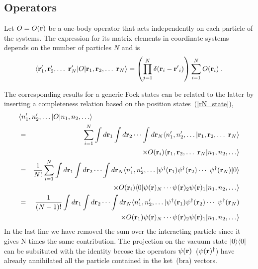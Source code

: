 \subsection{Operators}

Let ${O}=O({\bf r})$ be a one-body operator that acts independently on each particle
of the systems. The expression for its matrix elements in coordinate systems
depends on the number of particles $N$ and is
\begin{equation}
\langle {\bf r}'_1, {\bf r}'_2, \ldots \; {\bf r}'_N \vert {O}
\vert {\bf r}_1, {\bf r}_2, \ldots \; {\bf r}_N \rangle
 = \left( \prod_{j=1}^N  \delta({\bf r}_i - {\bf r'}_i) \right) \sum_{i=1}^N O({\bf r}_i)  \; .
\end{equation}

The corresponding results for a generic Fock states can be related to the latter by inserting a completeness relation based on the position states~(\ref{rN_state}),
\begin{eqnarray}
\lefteqn{
  \langle n'_1, n'_2, \ldots \vert {O} \vert n_1, n_2, \ldots  \rangle
} & &
\nonumber \\ 
 &=&  \sum_{i=1}^N \int d{\bf r}_1 \int d{\bf r}_2 \cdots \int d{\bf r}_N 
     \langle n'_1, n'_2, \ldots \vert {\bf r}_1, {\bf r}_2, \ldots \; {\bf r}_N \rangle 
\nonumber \\
 & &  \hspace{2.0cm}  \times O({\bf r}_i) 
    \langle  {\bf r}_1, {\bf r}_2, \ldots \; {\bf r}_N \vert n_1, n_2, \ldots  \rangle 
\\ 
 &=& \frac{1}{N!} \sum_{i=1}^N \int d{\bf r}_1 \int d{\bf r}_2 \cdots \int d{\bf r}_N 
    \langle n'_1, n'_2, \ldots \vert  \psi^\dag({\bf r}_1) \psi^\dag({\bf r}_2) \cdots \; \psi^\dag({\bf r}_N)
    \vert 0 \rangle
\nonumber \\
 & &  \hspace{2.0cm}  \times O({\bf r}_i)  
     \langle 0 \vert \psi({\bf r})_N \cdots \psi({\bf r})_2  \psi({\bf r})_1
     \vert n_1, n_2, \ldots  \rangle 
\nonumber \\ 
 &=& \frac{1}{(N-1)!} \int d{\bf r}_1 \int d{\bf r}_2 \cdots \int d{\bf r}_N 
    \langle n'_1, n'_2, \ldots \vert  \psi^\dag({\bf r}_1) \psi^\dag({\bf r}_2) \cdots \; \psi^\dag({\bf r}_N)
\nonumber \\
 & &  \hspace{2.0cm}  \times O({\bf r}_1)  
      \psi({\bf r})_N \cdots \psi({\bf r})_2  \psi({\bf r})_1
     \vert n_1, n_2, \ldots  \rangle 
\nonumber
\end{eqnarray}
In the last line we have removed the sum over the interacting particle since it gives N times the same contribution. The projection on the vacuum state $\vert0\rangle \langle 0 \vert$ can be subsituted with
the identity becose the operators $\psi({\bf r})$~($\psi({\bf r})^\dag$) have already annihilated all the particle contained in the ket~(bra) vectors.

